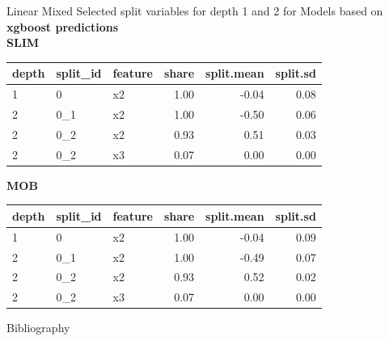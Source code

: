 \documentclass[9pt, xcolor=table]{beamer}
\begin{document}
\begin{frame}{Linear Mixed}
Selected split variables for depth 1 and 2 for Models based on \textbf{xgboost predictions}\\
\textbf{SLIM}

\begin{table}[ht]
\centering
\begin{tabular}{lllrrr}
  \hline
depth & split\_id & feature & share & split.mean & split.sd \\ 
  \hline
1 & 0 & x2 & 1.00 & -0.04 & 0.08 \\ 
  2 & 0\_1 & x2 & 1.00 & -0.50 & 0.06 \\ 
  2 & 0\_2 & x2 & 0.93 & 0.51 & 0.03 \\ 
  2 & 0\_2 & x3 & 0.07 & 0.00 & 0.00 \\ 
   \hline
\end{tabular}
\end{table}

\textbf{MOB}
\begin{table}[ht]
\centering
\begin{tabular}{lllrrr}
  \hline
depth & split\_id & feature & share & split.mean & split.sd \\ 
  \hline
1 & 0 & x2 & 1.00 & -0.04 & 0.09 \\ 
  2 & 0\_1 & x2 & 1.00 & -0.49 & 0.07 \\ 
  2 & 0\_2 & x2 & 0.93 & 0.52 & 0.02 \\ 
  2 & 0\_2 & x3 & 0.07 & 0.00 & 0.00 \\ 
   \hline
\end{tabular}
\end{table}
\end{frame}


\begin{frame}{Bibliography}
    
    

\end{frame}
\end{document}
